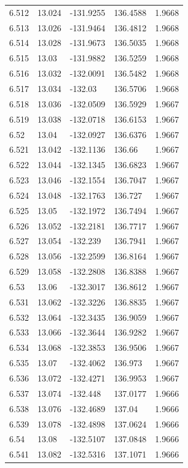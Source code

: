 \begin{tabular}{lllll}
6.512 & 13.024 & -131.9255 & 136.4588 & 1.9668 \\
6.513 & 13.026 & -131.9464 & 136.4812 & 1.9668 \\
6.514 & 13.028 & -131.9673 & 136.5035 & 1.9668 \\
6.515 & 13.03 & -131.9882 & 136.5259 & 1.9668 \\
6.516 & 13.032 & -132.0091 & 136.5482 & 1.9668 \\
6.517 & 13.034 & -132.03 & 136.5706 & 1.9668 \\
6.518 & 13.036 & -132.0509 & 136.5929 & 1.9667 \\
6.519 & 13.038 & -132.0718 & 136.6153 & 1.9667 \\
6.52 & 13.04 & -132.0927 & 136.6376 & 1.9667 \\
6.521 & 13.042 & -132.1136 & 136.66 & 1.9667 \\
6.522 & 13.044 & -132.1345 & 136.6823 & 1.9667 \\
6.523 & 13.046 & -132.1554 & 136.7047 & 1.9667 \\
6.524 & 13.048 & -132.1763 & 136.727 & 1.9667 \\
6.525 & 13.05 & -132.1972 & 136.7494 & 1.9667 \\
6.526 & 13.052 & -132.2181 & 136.7717 & 1.9667 \\
6.527 & 13.054 & -132.239 & 136.7941 & 1.9667 \\
6.528 & 13.056 & -132.2599 & 136.8164 & 1.9667 \\
6.529 & 13.058 & -132.2808 & 136.8388 & 1.9667 \\
6.53 & 13.06 & -132.3017 & 136.8612 & 1.9667 \\
6.531 & 13.062 & -132.3226 & 136.8835 & 1.9667 \\
6.532 & 13.064 & -132.3435 & 136.9059 & 1.9667 \\
6.533 & 13.066 & -132.3644 & 136.9282 & 1.9667 \\
6.534 & 13.068 & -132.3853 & 136.9506 & 1.9667 \\
6.535 & 13.07 & -132.4062 & 136.973 & 1.9667 \\
6.536 & 13.072 & -132.4271 & 136.9953 & 1.9667 \\
6.537 & 13.074 & -132.448 & 137.0177 & 1.9666 \\
6.538 & 13.076 & -132.4689 & 137.04 & 1.9666 \\
6.539 & 13.078 & -132.4898 & 137.0624 & 1.9666 \\
6.54 & 13.08 & -132.5107 & 137.0848 & 1.9666 \\
6.541 & 13.082 & -132.5316 & 137.1071 & 1.9666 \\

\end{tabular}
